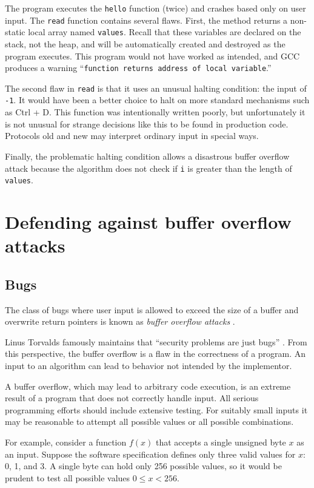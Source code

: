 \documentclass{book}
\begin{document}
The program executes the \texttt{hello} function (twice) and crashes based only on user input. The \texttt{read} function contains several flaws. First, the method returns a non-static local array named \texttt{values}. Recall that these variables are declared on the stack, not the heap, and will be automatically created and destroyed as the program executes. This program would not have worked as intended, and GCC produces a warning ``\texttt{function returns address of local variable}.''

The second flaw in \texttt{read} is that it uses an unusual halting condition: the input of \texttt{-1}. It would have been a better choice to halt on more standard mechanisms such as Ctrl + D. This function was intentionally written poorly, but unfortunately it is not unusual for strange decisions like this to be found in production code. Protocols old and new may interpret ordinary input in special ways.

Finally, the problematic halting condition allows a disastrous buffer overflow attack because the algorithm does not check if \texttt{i} is greater than the length of \texttt{values}.

\section{Defending against buffer overflow attacks}

\subsection{Bugs}
The class of bugs where user input is allowed to exceed the size of a buffer and overwrite return pointers is known as \textit{buffer overflow attacks} \cite{Erickson:2008:HAE:1407147}.

Linus Torvalds famously maintains that ``security problems are just bugs'' \cite{torvalds_2017}. From this perspective, the buffer overflow is a flaw in the correctness of a program. An input to an algorithm can lead to behavior not intended by the implementor.

A buffer overflow, which may lead to arbitrary code execution, is an extreme result of a program that does not correctly handle input. All serious programming efforts should include extensive testing. For suitably small inputs it may be reasonable to attempt all possible values or all possible combinations.

For example, consider a function $f(x)$ that accepts a single unsigned byte $x$ as an input. Suppose the software specification defines only three valid values for $x$: 0, 1, and 3. A single byte can hold only 256 possible values, so it would be prudent to test all possible values $0 \le x < 256$.
\end{document}
